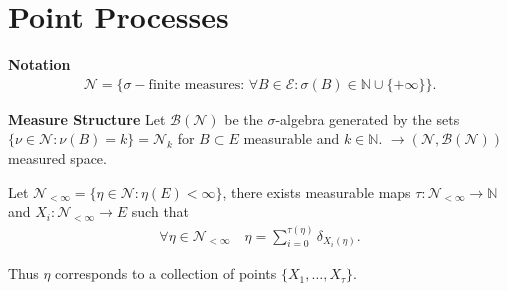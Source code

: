\section{Point Processes}
\textbf{Notation} 
\begin{align}
	\mathcal{N}=\{\sigma-\textrm{finite measures: } \forall B \in \mathcal{E}: \sigma(B) \in \mathbb{N} \cup \{+\infty\}\}.
\end{align}

\noindent
\textbf{Measure Structure} Let $\mathcal{B}(\mathcal{N})$ be the $\sigma$-algebra generated by the sets $\{\nu \in \mathcal{N}: \nu(B)=k\}=\mathcal{N}_k$ for $B \subset E$ measurable and $k \in \mathbb{N}$. $\to (\mathcal{N}, \mathcal{B}(\mathcal{N}))$ measured space.

\begin{prop}
	Let $\mathcal{N}_{<\infty}=\{\eta \in \mathcal{N}: \eta(E)<\infty \}$, there exists measurable maps $\tau: \mathcal{N}_{< \infty} \to \mathbb{N}$ and $ X_i: \mathcal{N}_{< \infty} \to E$ such that 
	\begin{align}
		\forall \eta \in \mathcal{N}_{<\infty}\quad \eta = \sum_{i=0}^{\tau(\eta)} \delta_{X_i(\eta)}.
	\end{align}
\end{prop}
\begin{rmk}[]
	Thus $\eta$ corresponds to a collection of points $\{X_1, \ldots ,X_{\tau}\}$.
\end{rmk}
